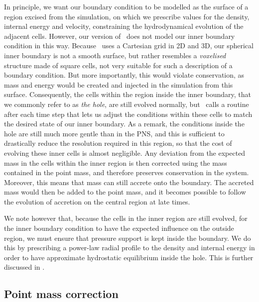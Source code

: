 In principle, we want our boundary condition to be modelled as the surface of a region excised from the simulation, on which we prescribe values for the density, internal energy and velocity, constraining the hydrodynamical evolution of the adjacent cells. However, our version of \flash\ does not model our inner boundary condition in this way. Because \flash\ uses a Cartesian grid in 2D and 3D, our spherical inner boundary is not a smooth surface, but rather resembles a \emph{voxelised} structure made of square cells, not very suitable for such a description of a boundary condition. But more importantly, this would violate conservation, as mass and energy would be created and injected in the simulation from this surface. Consequently, the cells within the region inside the inner boundary, that we commonly refer to as \emph{the hole}, are still evolved normally, but \flash\ calls a routine after each time step that lets us adjust the conditions within these cells to match the desired state of our inner boundary. As a remark, the conditions inside the hole are still much more gentle than in the PNS, and this is sufficient to drastically reduce the resolution required in this region, so that the cost of evolving these inner cells is almost negligible. Any deviation from the expected mass in the cells within the inner region is then corrected using the mass contained in the point mass, and therefore preserves conservation in the system. Moreover, this means that mass can still accrete onto the boundary. The accreted mass would then be added to the point mass, and it becomes possible to follow the evolution of accretion on the central region at late times.

We note however that, because the cells in the inner region are still evolved, for the inner boundary condition to have the expected influence on the outside region, we must ensure that pressure support is kept inside the boundary. We do this by prescribing a power-law radial profile to the density and internal energy in order to have approximate hydrostatic equilibrium inside the hole. This is further discussed in .

\subsection{Point mass correction} \label{sec:pm_correction}


